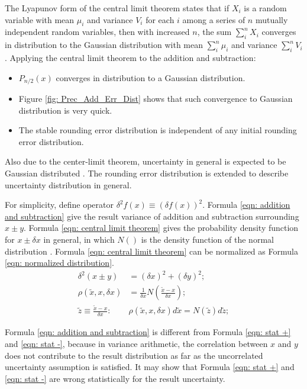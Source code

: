 \documentclass[twoside]{article}
\numberwithin{equation}{section}
\newcommand{\eqspace}{\;\;\;}
\begin{document}
The Lyapunov form of the central limit theorem \cite{Probability_Statistics} states that if $X_i$ is a random variable with mean $\mu_i$ and variance $V_i$ for each $i$ among a series of $n$ mutually independent random variables, then with increased $n$, the sum $\sum\limits_{i}^{n} X_i$ converges in distribution to the Gaussian distribution with mean $\sum\limits_{i}^{n} \mu_i$ and variance $\sum\limits_{i}^{n} V_i$. Applying the central limit theorem to the addition and subtraction: 
\begin{itemize} 
\item $P_{n/2}(x)$ converges in distribution to a Gaussian distribution.

\item Figure \ref{fig: Prec_Add_Err_Dist} shows that such convergence to Gaussian distribution is very quick. 

\item The stable rounding error distribution is independent of any initial rounding error distribution. 
\end{itemize} 

Also due to the center-limit theorem, uncertainty in general is expected to be Gaussian distributed \cite{Statistical_Methods} \cite{Probability_Statistics}. 
The rounding error distribution is extended to describe uncertainty distribution in general.

For simplicity, define operator $\delta^2 f(x) \equiv (\delta f(x))^2$. 
Formula \eqref{eqn: addition and subtraction} give the result variance of addition and subtraction surrounding $x \pm y$.
Formula \eqref{eqn: central limit theorem} gives the probability density function for $x \pm \delta x$ in general, in which $N()$ is the density function of the  normal distribution \cite{Probability_Statistics}.
Formula \eqref{eqn: central limit theorem} can be normalized as Formula \eqref{eqn: normalized distribution}.
\begin{align}
\label{eqn: addition and subtraction}
\delta^2 (x \pm y) &= (\delta x)^2 + (\delta y)^2; \\
\label{eqn: central limit theorem}
\rho(\tilde{x}, x, \delta x) & = \frac{1}{\delta x} N(\frac{\tilde{x} - x}{\delta x}); \\
\label{eqn: normalized distribution}
\tilde{z} \equiv \frac{\tilde{x} - x}{\delta x}:\eqspace & \rho(\tilde{x}, x, \delta x) d \tilde{x} = N(\tilde{z}) d \tilde{z};
\end{align}

Formula \eqref{eqn: addition and subtraction} is different from Formula \eqref{eqn: stat +} and \eqref{eqn: stat -}, because in variance arithmetic, the correlation between $x$ and $y$ does not contribute to the result distribution as far as the uncorrelated uncertainty assumption is satisfied.
It may show that Formula \eqref{eqn: stat +} and \eqref{eqn: stat -} are wrong statistically for the result uncertainty.
\end{document}
